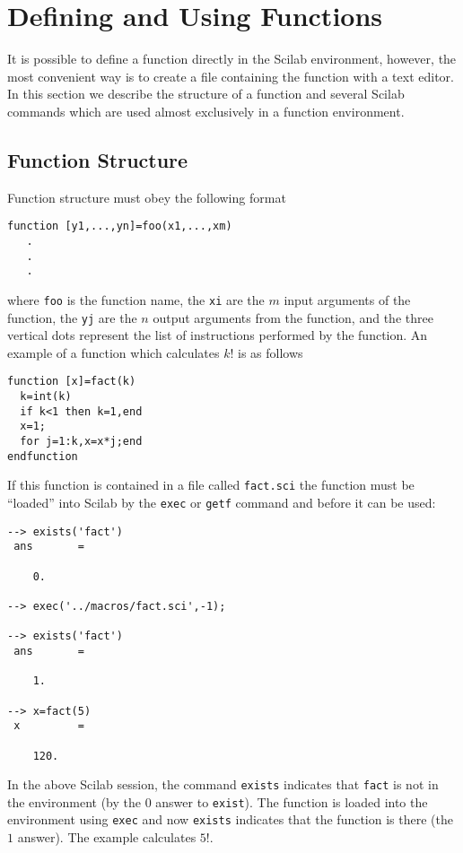 \section{Defining and Using Functions}
\label{s4.2}

        It is possible to define a function directly in
the Scilab environment, however, the most convenient way
is to create a file containing the function
with a text editor.  In this section we describe the
structure of a function and several Scilab commands which are
used almost exclusively in a function environment.

\subsection{Function Structure}
Function structure must obey the following format
\begin{verbatim}
function [y1,...,yn]=foo(x1,...,xm)
   .
   .
   .
\end{verbatim}
where {\tt foo} is the function name, the {\tt xi} are the $m$ input arguments
of the function,  the {\tt yj} are the $n$ output arguments from the function, and
the three vertical dots represent the list of instructions performed by
the function.  An example of a function
which calculates $k!$ is as follows
\begin{verbatim}
function [x]=fact(k)
  k=int(k)
  if k<1 then k=1,end
  x=1;
  for j=1:k,x=x*j;end
endfunction
\end{verbatim}
If this function is contained in a file called {\tt fact.sci} the function
must be ``loaded'' into  Scilab by the {\tt exec} or {\tt getf} command and before
it can be used:
\begin{verbatim}
--> exists('fact')
 ans       =
 
    0.  
 
--> exec('../macros/fact.sci',-1);
 
--> exists('fact')
 ans       =
 
    1.  
 
--> x=fact(5)
 x         =
 
    120.  
\end{verbatim}
In the above Scilab session, the command 
{\tt exists} 
indicates that
{\tt fact} is not in the environment (by the $0$ answer to {\tt exist}).  The
function is loaded into the environment using {\tt exec} and now {\tt exists}
indicates that the function is there (the $1$ answer).  The example 
calculates $5!$. 

